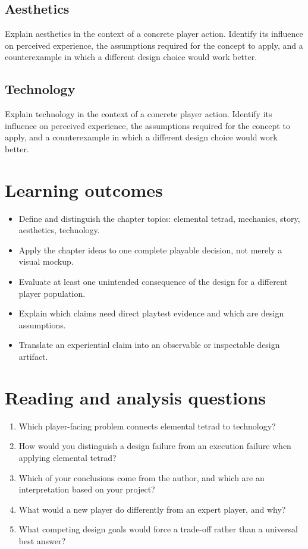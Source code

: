 \documentclass[11pt]{article}
\begin{document}
\subsection{Aesthetics}
Explain aesthetics in the context of a concrete player action. Identify its influence on perceived experience, the assumptions required for the concept to apply, and a counterexample in which a different design choice would work better.


\subsection{Technology}
Explain technology in the context of a concrete player action. Identify its influence on perceived experience, the assumptions required for the concept to apply, and a counterexample in which a different design choice would work better.


\section{Learning outcomes}
\begin{itemize}
\item Define and distinguish the chapter topics: elemental tetrad, mechanics, story, aesthetics, technology.
\item Apply the chapter ideas to one complete playable decision, not merely a visual mockup.
\item Evaluate at least one unintended consequence of the design for a different player population.
\item Explain which claims need direct playtest evidence and which are design assumptions.
\item Translate an experiential claim into an observable or inspectable design artifact.
\end{itemize}

\section{Reading and analysis questions}
\begin{enumerate}
\item Which player-facing problem connects elemental tetrad to technology?
\item How would you distinguish a design failure from an execution failure when applying elemental tetrad?
\item Which of your conclusions come from the author, and which are an interpretation based on your project?
\item What would a new player do differently from an expert player, and why?
\item What competing design goals would force a trade-off rather than a universal best answer?
\end{enumerate}
\end{document}
